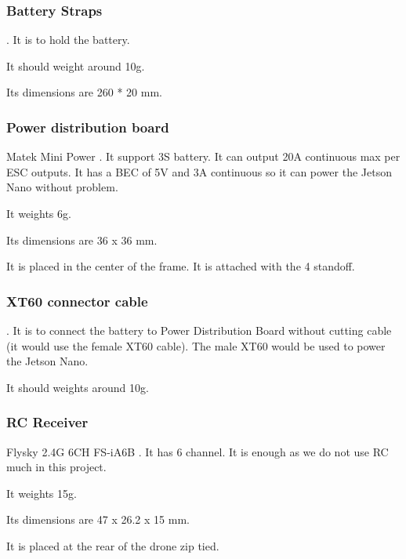             \subsubsection{Battery Straps}
                \cite{bangood_battery_strap}. It is to hold the battery.
                
                It should weight around 10g.
                
                Its dimensions are 260 * 20 mm.
                
            \subsubsection{Power distribution board}
                Matek Mini Power \cite{bangood_pdb}. It support 3S battery. It can output 20A continuous max per ESC outputs. It has a BEC of 5V and 3A continuous so it can power the Jetson Nano without problem.
                
                It weights 6g.
                
                Its dimensions are 36 x 36 mm.
                
                It is placed in the center of the frame. It is attached with the 4 standoff.
                
            \subsubsection{XT60 connector cable}
                \cite{bangood_xt60_cable}. It is to connect the battery to Power Distribution Board without cutting cable (it would use the female XT60 cable). The male XT60 would be used to power the Jetson Nano.
                
                It should weights around 10g.
                
            \subsubsection{RC Receiver}
                Flysky 2.4G 6CH FS-iA6B \cite{bangood_receiver}. It has 6 channel. It is enough as we do not use RC much in this project.
                
                It weights 15g.
                
                Its dimensions are 47 x 26.2 x 15 mm.
                
                It is placed at the rear of the drone zip tied.
                
